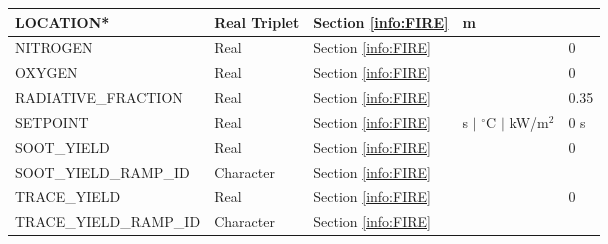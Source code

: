 \begin{minipage}{6.5in}
\begin{longtable}{@{\extracolsep{\fill}}|l|l|l|l|l|}
{\ct LOCATION}*             & Real Triplet        & Section \ref{info:FIRE}                 & m                           &                 \\ \hline
{\ct NITROGEN}             & Real     & Section \ref{info:FIRE}                 &                             & 0                \\ \hline
{\ct OXYGEN}               & Real     & Section \ref{info:FIRE}                 &                             & 0                \\ \hline
{\ct RADIATIVE\_FRACTION}  & Real        & Section \ref{info:FIRE}                 &                             &     0.35        \\ \hline
{\ct SETPOINT}             & Real        & Section \ref{info:FIRE}                 & s $\mid$ $^\circ$C $\mid$ kW/m$^2$  & 0 s        \\ \hline
{\ct SOOT\_YIELD}          & Real        & Section \ref{info:FIRE}                 &                             & 0                \\ \hline
{\ct SOOT\_YIELD\_RAMP\_ID}            & Character        & Section \ref{info:FIRE}                 &                             &                 \\ \hline
{\ct TRACE\_YIELD}         & Real        & Section \ref{info:FIRE}                 &                             &  0               \\ \hline
{\ct TRACE\_YIELD\_RAMP\_ID}            & Character        & Section \ref{info:FIRE}                 &                             &                 \\ \hline
\end{longtable}
\end{minipage}


